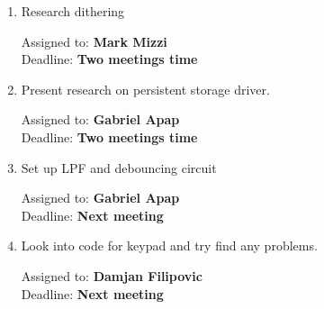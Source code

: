 \documentclass[11pt,a4paper]{scrartcl}
\begin{document}
\begin{enumerate}

\item Research dithering
\begin{flushright}
Assigned to: \textbf{Mark Mizzi} \\
Deadline: \textbf{Two meetings time}
\end{flushright}

\item Present research on persistent storage driver.
\begin{flushright}
Assigned to: \textbf{Gabriel Apap} \\
Deadline: \textbf{Two meetings time}
\end{flushright}

\item Set up LPF and debouncing circuit
\begin{flushright}
Assigned to: \textbf{Gabriel Apap} \\
Deadline: \textbf{Next meeting}
\end{flushright}

\item Look into code for keypad and try find any problems.
\begin{flushright}
Assigned to: \textbf{Damjan Filipovic} \\
Deadline: \textbf{Next meeting}
\end{flushright}


\end{enumerate}
\end{document}
